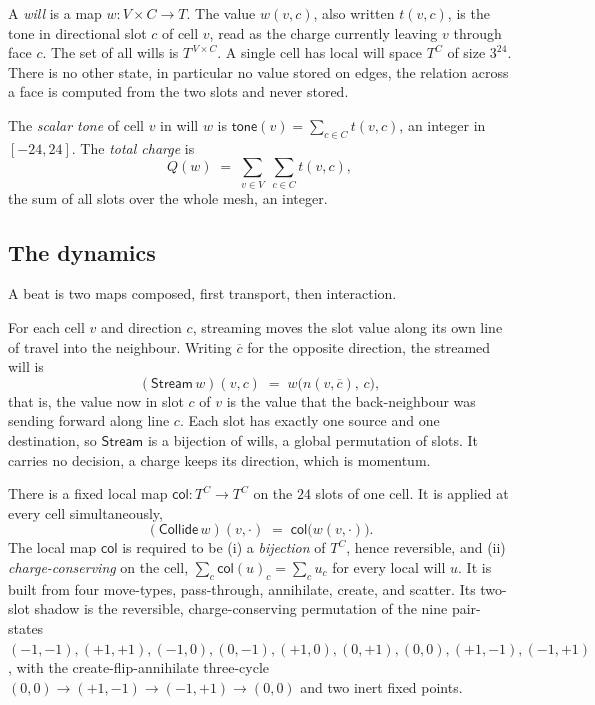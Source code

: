 \begin{definition}
A \emph{will} is a map $w : V \times C \to T$. The value $w(v, c)$, also written $t(v, c)$, is the tone in
directional slot $c$ of cell $v$, read as the charge currently leaving $v$ through face $c$. The set of all wills
is $T^{\,V \times C}$. A single cell has local will space $T^{C}$ of size $3^{24}$. There is no other state, in
particular no value stored on edges, the relation across a face is computed from the two slots and never stored.
\end{definition}

\begin{definition}
The \emph{scalar tone} of cell $v$ in will $w$ is $\mathsf{tone}(v) = \sum_{c \in C} t(v, c)$, an integer in
$[-24, 24]$. The \emph{total charge} is
\[
Q(w) \;=\; \sum_{v \in V} \; \sum_{c \in C} t(v, c),
\]
the sum of all slots over the whole mesh, an integer.
\end{definition}

\subsection{The dynamics}

A beat is two maps composed, first transport, then interaction.

\begin{definition}[Stream]
For each cell $v$ and direction $c$, streaming moves the slot value along its own line of travel into the
neighbour. Writing $\overline{c}$ for the opposite direction, the streamed will is
\[
(\mathsf{Stream}\, w)(v, c) \;=\; w\big(n(v, \overline{c}), \, c\big),
\]
that is, the value now in slot $c$ of $v$ is the value that the back-neighbour was sending forward along line $c$.
Each slot has exactly one source and one destination, so $\mathsf{Stream}$ is a bijection of wills, a global
permutation of slots. It carries no decision, a charge keeps its direction, which is momentum.
\end{definition}

\begin{definition}[Collide]
There is a fixed local map $\mathsf{col} : T^{C} \to T^{C}$ on the $24$ slots of one cell. It is applied at every
cell simultaneously,
\[
(\mathsf{Collide}\, w)(v, \cdot) \;=\; \mathsf{col}\big(w(v, \cdot)\big).
\]
The local map $\mathsf{col}$ is required to be (i) a \emph{bijection} of $T^{C}$, hence reversible, and (ii)
\emph{charge-conserving} on the cell, $\sum_c \mathsf{col}(u)_c = \sum_c u_c$ for every local will $u$. It is
built from four move-types, pass-through, annihilate, create, and scatter. Its two-slot shadow is the reversible,
charge-conserving permutation of the nine pair-states $(-1,-1), (+1,+1), (-1,0), (0,-1), (+1,0), (0,+1), (0,0),
(+1,-1), (-1,+1)$, with the create-flip-annihilate three-cycle $(0,0) \to (+1,-1) \to (-1,+1) \to (0,0)$ and two
inert fixed points.
\end{definition}

